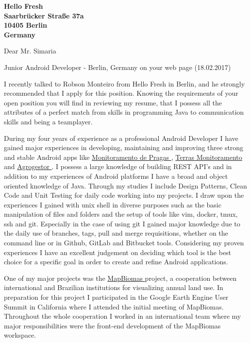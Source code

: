 \documentclass[a4paper]{joaosoares-letter}
\begin{document}
\longindentation=0pt

\begin{letter}{\bfseries Hello Fresh\\Saarbrücker Straße 37a\\10405  Berlin\\Germany}



\date{Belém, \today}

\opening{Dear Mr. Simaria}{Junior Android Developer - Berlin, Germany on your web page (18.02.2017)}



I recently talked to Robson Monteiro from Hello Fresh in Berlin, and he strongly recommended that I apply for this position. Knowing the requirements of your open position you will find in reviewing my resume, that I possess all the attributes of a perfect match from skills in programming Java to communication skills and being a teamplayer.

During my four years of experience as a professional Android Developer I have gained major experiences in developing, maintaining and improving three strong and stable Android apps like \href{https://goo.gl/RcdbHk}{ Monitoramento de Pragas }, \href{https://goo.gl/OyZXke}{ Terras Monitoramento } and \href{https://goo.gl/mycBmL}{ Agrogestor }. I possess a large knowledge of building REST API's and in addition to my experiences of Android platforms I have a broad and object oriented knowledge of Java. Through my studies I include Design Patterns, Clean Code and Unit Testing for daily code working into my projects. I draw upon the experiences I gained with unix shell in diverse purposes such as the basic manipulation of files and folders and the setup of tools like vim, docker, tmux, ssh and git. Especially in the case of using git I gained major knowledge due to the daily use of branches, tags, pull and merge requisitions, whether on the command line or in Github, GitLab and Bitbucket tools. Considering my proven experiences I have an excellent judgement on deciding which tool is the best choice for a specific goal in order to create and refine Android applications.

One of my major projects was the \href{https://goo.gl/eYX5SW}{ MapBiomas } project, a cooperation between international and Brazilian institutions for visualizing annual land use. In preparation for this project I participated in the Google Earth Engine User Summit in California where I attended the initial meeting of MapBiomas. Throughout the whole cooperation I worked in an international team where my major responsibilities were the front-end development of the MapBiomas workspace.


\end{letter}
\end{document}
